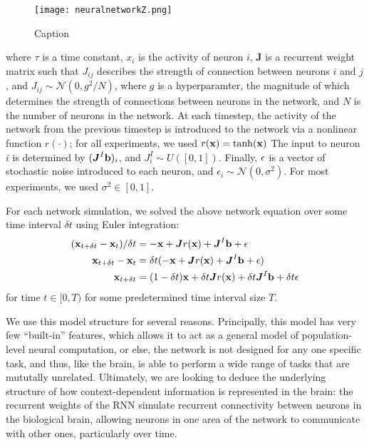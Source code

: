 \documentclass[12pt,a4paper,final]{iopart}
\begin{document}
\begin{figure}
    \centering
    \texttt{[image: neuralnetworkZ.png]}
    \caption{Caption}
    \label{fig:my_label}
\end{figure}

where $\tau$ is a time constant, $x_i$ is the activity of neuron $i$, $\boldsymbol{J}$ is a recurrent weight matrix such that $J_{ij}$ describes the strength of connection between neurons $i$ and $j$, and $J_{ij} \sim \mathcal{N}(0, g^2/N)$, where $g$ is a hyperparamter, the magnitude of which determines the strength of connections between neurons in the network, and $N$ is the number of neurons in the network. At each timestep, the activity of the network from  the previous timestep is introduced to the network via a nonlinear function $r(\cdot)$; for all experiments, we used $r({\bf x}) = \tanh({\bf x})$ The input to neuron $i$ is determined by $(\boldsymbol{J}^I{\bf b})_i$, and $J^I_i \sim U([0, 1])$. Finally, ${\bf \epsilon}$ is a vector of stochastic noise introduced to each neuron, and $\epsilon_i \sim \mathcal{N}(0, \sigma^2)$. For most experiments, we used $\sigma^2 \in [0, 1]$.

For each network simulation, we solved the above network equation over some time interval $\delta t$ using Euler integration:
\begin{align*}
    ({\bf x}_{t+\delta t} - {\bf x}_t) / \delta t &= -{\bf x} + \boldsymbol{J}r({\bf x}) + \boldsymbol{J}^I{\bf b} + {\bf \epsilon} \\
    {\bf x}_{t+\delta t} - {\bf x}_t &= \delta t(-{\bf x} + \boldsymbol{J}r({\bf x}) + \boldsymbol{J}^I{\bf b} + {\bf \epsilon}) \\
    {\bf x}_{t+\delta t} &= (1 - \delta t){\bf x} + \delta t \boldsymbol{J}r({\bf x}) + \delta t \boldsymbol{J}^I{\bf b} + \delta t {\bf \epsilon}
\end{align*}
for time $t \in [0, T)$ for some predetermined time interval size $T$.

We use this model structure for several reasons. Principally, this model has very few ``built-in'' features, which allows it to act as a general model of population-level neural computation, or else, the network is not designed for any one specific task, and thus, like the brain, is able to perform a wide range of tasks that are mututally unrelated. Ultimately, we are looking to deduce the underlying structure of how context-dependent information is represented in the brain: the recurrent weights of the RNN simulate recurrent connectivity between neurons in the biological brain, allowing neurons in one area of the network to communicate with other ones, particularly over time.
\end{document}
